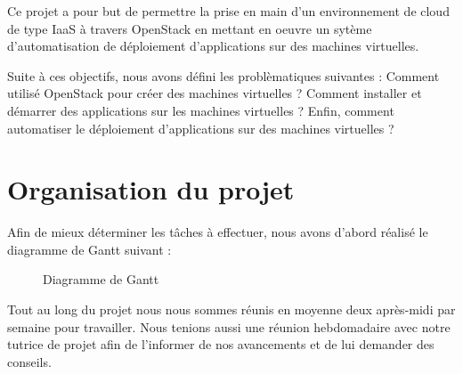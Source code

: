 \documentclass{report}
\begin{document}
        Ce projet a pour but de permettre la prise en main d'un environnement de cloud de type IaaS à travers OpenStack en mettant en oeuvre un sytème d'automatisation de déploiement d'applications sur des machines virtuelles.\bigbreak

        Suite à ces objectifs, nous avons défini les problèmatiques suivantes :\newline
        Comment utilisé OpenStack pour créer des machines virtuelles ?\newline
        Comment installer et démarrer des applications sur les machines virtuelles ?\newline
        Enfin, comment automatiser le déploiement d'applications sur des machines virtuelles ?


	\section{Organisation du projet}

    	Afin de mieux déterminer les tâches à effectuer, nous avons d'abord réalisé le diagramme de Gantt suivant :

    	\begin{figure}[H]
            \caption{Diagramme de Gantt}
        \end{figure}
    	\bigbreak

        Tout au long du projet nous nous sommes réunis en moyenne deux après-midi par semaine pour travailler.
        Nous tenions aussi une réunion hebdomadaire avec notre tutrice de projet afin de l'informer de nos avancements et de lui demander des conseils.
\end{document}
